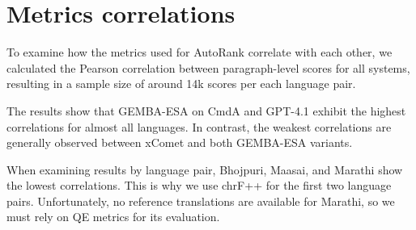 \documentclass[11pt]{article}
\begin{document}


\clearpage




\appendix
\onecolumn

\section{Metrics correlations}

To examine how the metrics used for AutoRank correlate with each other, we calculated the Pearson correlation between paragraph-level scores for all systems, resulting in a sample size of around 14k scores per each language pair.

The results show that GEMBA-ESA on CmdA and GPT-4.1 exhibit the highest correlations for almost all languages. In contrast, the weakest correlations are generally observed between xComet and both GEMBA-ESA variants.

When examining results by language pair, Bhojpuri, Maasai, and Marathi show the lowest correlations. This is why we use chrF++ for the first two language pairs. Unfortunately, no reference translations are available for Marathi, so we must rely on QE metrics for its evaluation.

\begin{table*}[h]
\small
\centering
\setlength{\tabcolsep}{4.9pt}

\end{table*}
\end{document}
